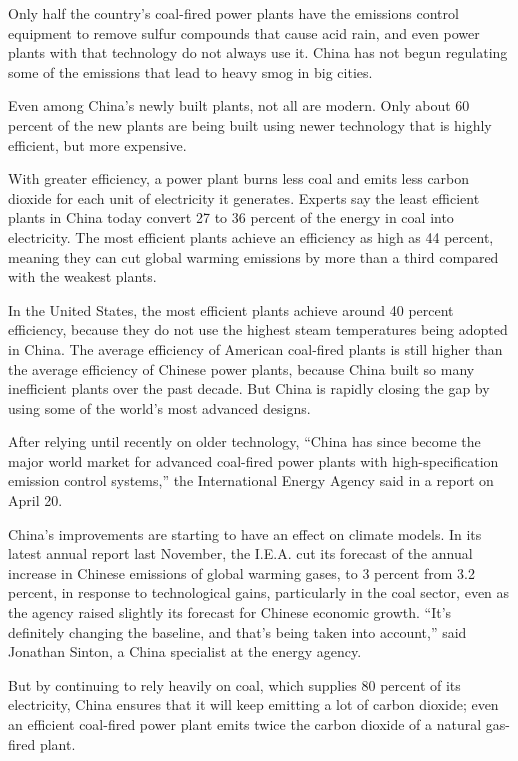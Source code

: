 \documentclass[12pt,a4paper,onecolumn]{article}
\begin{document}
Only half the country's coal-fired power plants have the emissions control equipment to remove
sulfur compounds that cause acid rain, and even power plants with that technology do not always use
it. China has not begun regulating some of the emissions that lead to heavy smog in big cities.

Even among China's newly built plants, not all are modern. Only about 60 percent of the new plants
are being built using newer technology that is highly efficient, but more expensive.

With greater efficiency, a power plant burns less coal and emits less carbon dioxide for each unit
of electricity it generates. Experts say the least efficient plants in China today convert 27 to 36
percent of the energy in coal into electricity. The most efficient plants achieve an efficiency as
high as 44 percent, meaning they can cut global warming emissions by more than a third compared with
the weakest plants.

In the United States, the most efficient plants achieve around 40 percent efficiency, because they
do not use the highest steam temperatures being adopted in China. The average efficiency of American
coal-fired plants is still higher than the average efficiency of Chinese power plants, because China
built so many inefficient plants over the past decade. But China is rapidly closing the gap by using
some of the world's most advanced designs.

After relying until recently on older technology, ``China has since become the major world market
for advanced coal-fired power plants with high-specification emission control systems,'' the
International Energy Agency said in a report on April 20.

China's improvements are starting to have an effect on climate models. In its latest annual report
last November, the I.E.A. cut its forecast of the annual increase in Chinese emissions of global
warming gases, to 3 percent from 3.2 percent, in response to technological gains, particularly in
the coal sector, even as the agency raised slightly its forecast for Chinese economic growth. ``It's
definitely changing the baseline, and that's being taken into account,'' said Jonathan Sinton, a
China specialist at the energy agency.

But by continuing to rely heavily on coal, which supplies 80 percent of its electricity, China
ensures that it will keep emitting a lot of carbon dioxide; even an efficient coal-fired power plant
emits twice the carbon dioxide of a natural gas-fired plant.
\end{document}
